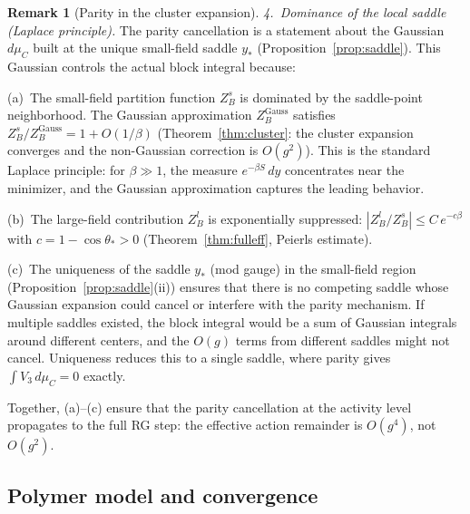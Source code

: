 \documentclass[11pt]{article}
\theoremstyle{definition}
\newtheorem{remark}[theorem]{Remark}
\begin{document}
\begin{remark}[Parity in the cluster expansion]
\emph{4.~Dominance of the local saddle (Laplace principle).}
The parity cancellation is a statement about the Gaussian
$d\mu_C$ built at the unique small-field saddle $y_*$
(Proposition~\ref{prop:saddle}).  This Gaussian
controls the actual block integral because:

(a)~The small-field partition function $Z_B^s$ is dominated by
the saddle-point neighborhood.  The Gaussian approximation
$Z_B^{\mathrm{Gauss}}$ satisfies
$Z_B^s/Z_B^{\mathrm{Gauss}}=1+O(1/\beta)$
(Theorem~\ref{thm:cluster}: the cluster expansion
converges and the non-Gaussian correction is $O(g^2)$).
This is the standard Laplace principle: for $\beta\gg 1$,
the measure $e^{-\beta S}\,dy$ concentrates near the minimizer,
and the Gaussian approximation captures the leading behavior.

(b)~The large-field contribution $Z_B^l$ is exponentially
suppressed: $|Z_B^l/Z_B^s|\le C\,e^{-c\beta}$ with
$c=1-\cos\theta_*>0$ (Theorem~\ref{thm:fulleff},
Peierls estimate).

(c)~The uniqueness of the saddle $y_*$ (mod gauge) in the
small-field region (Proposition~\ref{prop:saddle}(ii)) ensures
that there is no competing saddle whose Gaussian expansion
could cancel or interfere with the parity mechanism.  If
multiple saddles existed, the block integral would be a sum
of Gaussian integrals around different centers, and the
$O(g)$ terms from different saddles might not cancel.
Uniqueness reduces this to a single saddle, where parity
gives $\int V_3\,d\mu_C=0$ exactly.

Together, (a)--(c) ensure that the parity cancellation at
the activity level propagates to the full RG step: the
effective action remainder is $O(g^4)$, not $O(g^2)$.
\end{remark}

\subsection{Polymer model and convergence}
\end{document}
